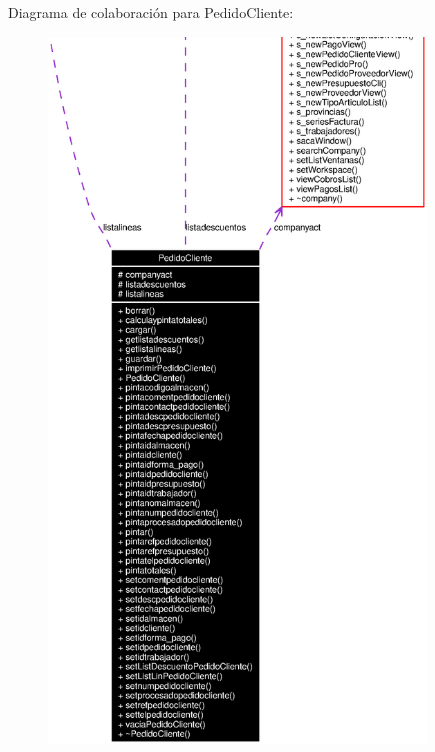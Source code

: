Diagrama de colaboraci\'{o}n para Pedido\-Cliente:\begin{figure}[H]
\begin{center}
\leavevmode
\includegraphics[width=284pt]{classPedidoCliente__coll__graph}
\end{center}
\end{figure}
